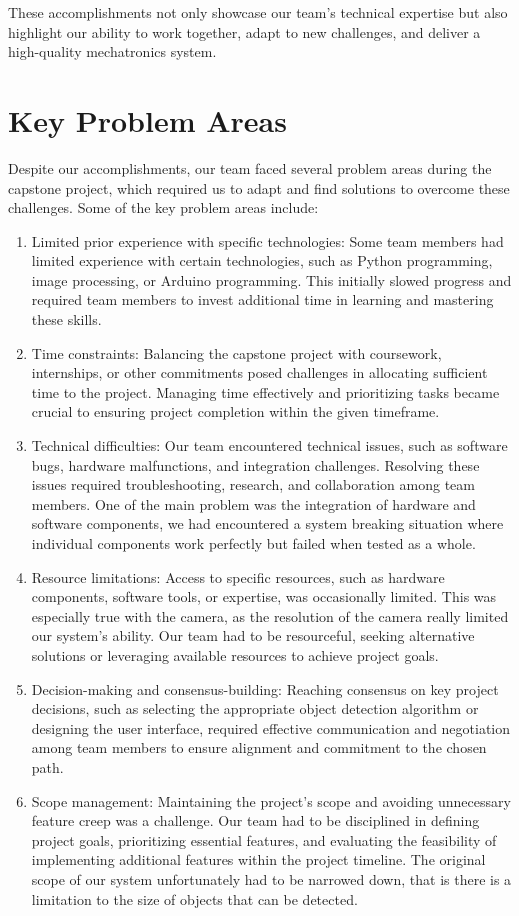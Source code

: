 \documentclass{article}
\begin{document}
These accomplishments not only showcase our team's technical expertise but also highlight our ability to work together, adapt to new challenges, and deliver a high-quality mechatronics system.
\section{Key Problem Areas}
Despite our accomplishments, our team faced several problem areas during the capstone project, which required us to adapt and find solutions to overcome these challenges. Some of the key problem areas include:
\begin{enumerate}
    \item Limited prior experience with specific technologies: Some team members had limited experience with certain technologies, such as Python programming, image processing, or Arduino programming. This initially slowed progress and required team members to invest additional time in learning and mastering these skills.
    \item Time constraints: Balancing the capstone project with coursework, internships, or other commitments posed challenges in allocating sufficient time to the project. Managing time effectively and prioritizing tasks became crucial to ensuring project completion within the given timeframe.
    \item Technical difficulties: Our team encountered technical issues, such as software bugs, hardware malfunctions, and integration challenges. Resolving these issues required troubleshooting, research, and collaboration among team members. One of the main problem was the integration of hardware and software components, we had encountered a system breaking situation where individual components work perfectly but failed when tested as a whole. 
    \item Resource limitations: Access to specific resources, such as hardware components, software tools, or expertise, was occasionally limited. This was especially true with the camera, as the resolution of the camera really limited our system's ability. Our team had to be resourceful, seeking alternative solutions or leveraging available resources to achieve project goals.
    \item Decision-making and consensus-building: Reaching consensus on key project decisions, such as selecting the appropriate object detection algorithm or designing the user interface, required effective communication and negotiation among team members to ensure alignment and commitment to the chosen path.
    \item Scope management: Maintaining the project's scope and avoiding unnecessary feature creep was a challenge. Our team had to be disciplined in defining project goals, prioritizing essential features, and evaluating the feasibility of implementing additional features within the project timeline. The original scope of our system unfortunately had to be narrowed down, that is there is a limitation to the size of objects that can be detected.
\end{enumerate}
\end{document}
